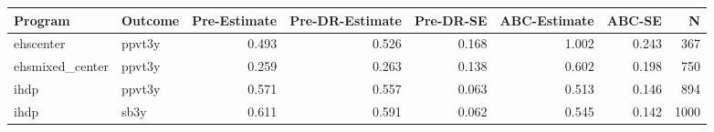 \begin{table}[ht]
\centering
\begin{tabular}{llrrrrrr}
  \hline
Program & Outcome & Pre-Estimate & Pre-DR-Estimate & Pre-DR-SE & ABC-Estimate & ABC-SE & N \\ 
  \hline
ehscenter & ppvt3y & 0.493 & 0.526 & 0.168 & 1.002 & 0.243 & 367 \\ 
  ehsmixed\_center & ppvt3y & 0.259 & 0.263 & 0.138 & 0.602 & 0.198 & 750 \\ 
  ihdp & ppvt3y & 0.571 & 0.557 & 0.063 & 0.513 & 0.146 & 894 \\ 
  ihdp & sb3y & 0.611 & 0.591 & 0.062 & 0.545 & 0.142 & 1000 \\ 
   \hline
\end{tabular}
\end{table}
